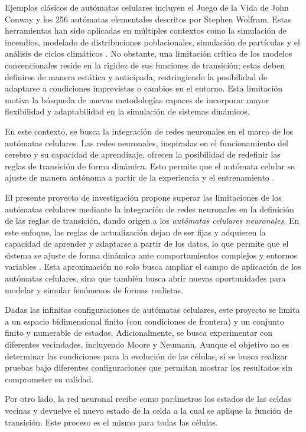 Ejemplos clásicos de autómatas celulares incluyen el Juego de la Vida de John Conway y los 256 autómatas elementales descritos por Stephen Wolfram. Estas herramientas han sido aplicadas en múltiples contextos como la simulación de incendios, modelado de distribuciones poblacionales, simulación de partículas y el análisis de ciclos climáticos \cite{darg}. No obstante, una limitación crítica de los modelos convencionales reside en la rigidez de sus funciones de transición; estas deben definirse de manera estática y anticipada, restringiendo la posibilidad de adaptarse a condiciones imprevistas o cambios en el entorno. Esta limitación motiva la búsqueda de nuevas metodologías capaces de incorporar mayor flexibilidad y adaptabilidad en la simulación de sistemas dinámicos. 

En este contexto, se busca la integración de redes neuronales en el marco de los autómatas celulares. Las redes neuronales, inspiradas en el funcionamiento del cerebro y su capacidad de aprendizaje, ofrecen la posibilidad de redefinir las reglas de transición de forma dinámica. Esto permite que el autómata celular se ajuste de manera autónoma a partir de la experiencia y el entrenamiento \cite{RN}. 

El presente proyecto de investigación propone superar las limitaciones de los autómatas celulares mediante la integración de redes neuronales en la definición de las reglas de transición, dando origen a los \textit{autómatas celulares neuronales}. En este enfoque, las reglas de actualización dejan de ser fijas y adquieren la capacidad de aprender y adaptarse a partir de los datos, lo que permite que el sistema se ajuste de forma dinámica ante comportamientos complejos y entornos variables \cite{redesNeuronales, distill}. Esta aproximación no solo busca ampliar el campo de aplicación de los autómatas celulares, sino que también busca abrir nuevas oportunidades para modelar y simular fenómenos de formas realistas.  

Dadas las infinitas configuraciones de autómatas celulares, este proyecto se limita a un espacio bidimensional finito (con condiciones de frontera) y un conjunto finito y numerable de estados. Adicionalmente, se busca experimentar con diferentes vecindades, incluyendo Moore y Neumann. Aunque el objetivo no es determinar las condiciones para la evolución de las células, sí se busca realizar pruebas bajo diferentes configuraciones que permitan mostrar los resultados sin comprometer su calidad.

Por otro lado, la red neuronal recibe como parámetros los estados de las celdas vecinas y devuelve el nuevo estado de la celda a la cual se aplique la función de transición. Este proceso es el mismo para todas las células.

